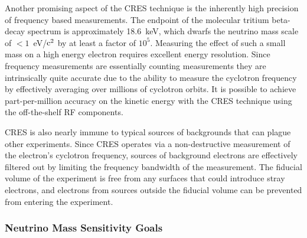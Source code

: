 Another promising aspect of the CRES technique is the inherently high precision of frequency based measurements. The endpoint of the molecular tritium beta-decay spectrum is approximately 18.6~keV, which dwarfs the neutrino mass scale of $<1$~eV/$\rm{c}^2$ by at least a factor of $10^5$. Measuring the effect of such a small mass on a high energy electron requires excellent energy resolution. Since frequency measurements are essentially counting measurements they are intrinsically quite accurate due to the ability to measure the cyclotron frequency by effectively averaging over millions of cyclotron orbits. It is possible to achieve part-per-million accuracy on the kinetic energy with the CRES technique using the off-the-shelf RF components.

CRES is also nearly immune to typical sources of backgrounds that can plague other experiments. Since CRES operates via a non-destructive measurement of the electron's cyclotron frequency, sources of background electrons are effectively filtered out by limiting the frequency bandwidth of the measurement. The fiducial volume of the experiment is free from any surfaces that could introduce stray electrons, and electrons from sources outside the fiducial volume can be prevented from entering the experiment.

\subsubsection*{Neutrino Mass Sensitivity Goals}

